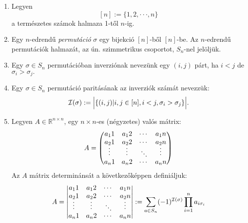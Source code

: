 \documentclass{article}
\begin{document}
    \begin{enumerate}[label=\alph*)]
    \item 
        Legyen
            \[ [n] := \{ 1, 2, \cdot \cdot \cdot , n \}\]
        a természetes számok halmaza 1-től $n$-ig.
    
    \item
       Egy $n$-edrendű \textit{permutáció} $\sigma$ egy bijekció $[n]$-ből $[n]$-be. Az $n$-edrendű permutációk halmazát, az ún. szimmetrikus csoportot, $S_n$-nel jelöljük.
    
    \item
        Egy $\sigma \in S_n$ permutációban inverziónak nevezünk egy $(i, j)$ párt, ha $i < j$
        de $\sigma_i > \sigma_j.$
    
    \item
       Egy $\sigma \in S_n$ permutáció paritásának az inverziók számát nevezzük:
        \[ \mathcal{I}(\sigma) := \Bigl\vert \{(i, j) | i, j \in [n], i < j, \sigma_i > \sigma_j\} \Bigr\vert . \]

    \item
        Legyen $ A \in \mathbb{R}^{n\times n} $, egy $n \times n$-es (négyzetes) valós mátrix:
                     \[ A = \left( \begin{matrix}
                                    a_11 & a_12 & \cdots & a_1n \\
                                    a_21 & a_22 & \cdots & a_2n \\
                                    \rotatebox{90}{$\cdots$} & \rotatebox{90}{$\cdots$} & \rotatebox{135}{$\cdots$} & \rotatebox{90}{$\cdots$}\\
                                    a_n1 & a_n2 & \cdots & a_nn \\
                                \end{matrix} \right) \]
        Az $A$ mátrix determinánsát a következőképpen definiáljuk:
        \begin{equation}
            A = \left\vert \begin{matrix}
                                    a_11 & a_12 & \cdots & a_1n \\
                                    a_21 & a_22 & \cdots & a_2n \\
                                    \rotatebox{90}{$\cdots$} & \rotatebox{90}{$\cdots$} & \rotatebox{135}{$\cdots$} & \rotatebox{90}{$\cdots$}\\
                                    a_n1 & a_n2 & \cdots & a_nn \\
                                \end{matrix} \right\vert 
                                := \sum_{a \in S_n} (-1)^{\mathcal{I}(\sigma)} \prod_{i=1}^n a_{i\sigma_i}
        \end{equation}
    \end{enumerate}
    
\end{document}
